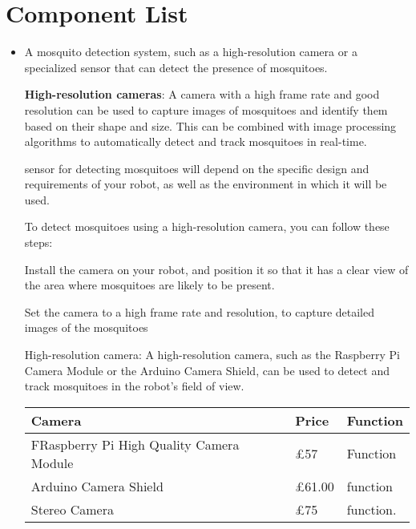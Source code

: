 \documentclass[11pt]{article}
\begin{document}
	\section{Component List}
	\begin{itemize}
		
	\item A mosquito detection system, such as a high-resolution camera or a specialized sensor that can detect the presence of mosquitoes.
	
	\textbf{High-resolution cameras}: A camera with a high frame rate and good resolution can be used to capture images of mosquitoes and identify them based on their shape and size. This can be combined with image processing algorithms to automatically detect and track mosquitoes in real-time.
	
		sensor for detecting mosquitoes will depend on the specific design and requirements of your robot, as well as the environment in which it will be used.
		 	

		

	To detect mosquitoes using a high-resolution camera, you can follow these steps:
	
	Install the camera on your robot, and position it so that it has a clear view of the area where mosquitoes are likely to be present.
	
	Set the camera to a high frame rate and resolution, to capture detailed images of the mosquitoes
	
	
	
	High-resolution camera: A high-resolution camera, such as the Raspberry Pi Camera Module or the Arduino Camera Shield, can be used to detect and track mosquitoes in the robot's field of view.
	
	
	\begin{center}
		\setlength{\tabcolsep}{10pt} %
		\renewcommand{\arraystretch}{1.5} %
		\begin{tabular}{ | m{3cm} |m{3cm} | m{4cm}|  } 
			\hline
			Camera  & Price &Function  \\ 
			
			\hline
			FRaspberry Pi High Quality Camera Module
			 & £57 & Function
			
			\\ 
			\hline
			Arduino Camera Shield & £61.00 & function
			\\ 
			\hline
			Stereo Camera & £75 & function.\\ 
			\hline
		\end{tabular}
	\end{center}
	

\end{itemize}
\end{document}
